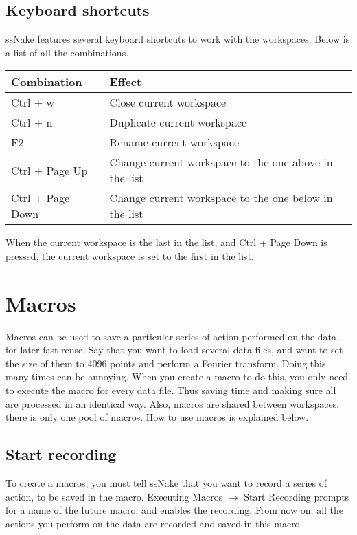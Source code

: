 \documentclass[11pt,a4paper]{article}
\begin{document}
\subsection{Keyboard shortcuts}
ssNake features several keyboard shortcuts to work with the workspaces. Below is a list of all the combinations.
\begin{center}
\begin{tabular}{ll}
\toprule
Combination & Effect \\
\midrule
\rowcolor{gray!30!white}
Ctrl + w & Close current workspace\\
Ctrl + n & Duplicate current workspace\\
\rowcolor{gray!30!white}
F2 & Rename  current workspace\\
Ctrl + Page Up & Change current workspace to the one above in the list\\
\rowcolor{gray!30!white}
Ctrl + Page Down & Change current workspace to the one below in the list\\
\bottomrule
\end{tabular}
\end{center}
When the current workspace is the last in the list, and Ctrl + Page Down is pressed, the current workspace is set to the first in the list.

\section{Macros}
Macros can be used to save a particular series of action performed on the data, for later fast reuse. Say that you want to load several data files, and want to set the size of them to 4096 points and perform a Fourier transform. Doing this many times can be annoying. When you create a macro to do this, you only need to execute the macro for every data file. Thus saving time and making sure all are processed in an identical way. Also, macros are shared between workspaces: there is only one pool of macros. How to use macros is explained below. 

\subsection{Start recording}
To create a macros, you must tell ssNake that you want to record a series of action, to be saved in the macro. Executing Macros $\rightarrow$ Start Recording prompts for a name of the future macro, and enables the recording. From now on, all the actions you perform on the data are recorded and saved in this macro.
\end{document}
